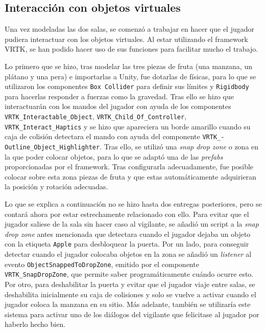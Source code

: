 \subsection{Interacción con objetos virtuales}

Una vez modeladas las dos salas, se comenzó a trabajar en hacer que el jugador pudiera interactuar con los objetos virtuales. Al estar utilizando el framework \acs{VRTK}, se han podido hacer uso de sus funciones para facilitar mucho el trabajo.

Lo primero que se hizo, tras modelar las tres piezas de fruta (una manzana, un plátano y una pera) e importarlas a Unity, fue dotarlas de físicas, para lo que se utilizaron los componentes \texttt{Box Collider} para definir sus límites y \texttt{Rigidbody} para hacerlas responder a fuerzas como la gravedad. Tras ello se hizo que interactuarán con los mandos del jugador con ayuda de los componentes \texttt{VRTK\_Interactable\_Object}, \texttt{VRTK\_Child\_Of\_Controller}, \texttt{VRTK\_Interact\_Haptics} y se hizo que apareciera un borde amarillo cuando su caja de colisión detectara el mando con ayuda del componente \texttt{VRTK\_-} \texttt{Outline\_Object\_Highlighter}. Tras ello, se utilizó una \textit{snap drop zone} o zona en la que poder colocar objetos, para lo que se adaptó una de las \textit{prefabs} proporcionadas por el framework. Tras configurarla adecuadamente, fue posible colocar sobre esta zona piezas de fruta y que estas automáticamente adquirieran la posición y rotación adecuadas.

Lo que se explica a continuación no se hizo hasta dos entregas posteriores, pero se contará ahora por estar estrechamente relacionado con ello. Para evitar que el jugador saliese de la sala sin hacer caso al vigilante, se añadió un script a la \textit{snap drop zone} antes mencionada que detectara cuando el jugador dejaba un objeto con la etiqueta \texttt{Apple} para desbloquear la puerta. Por un lado, para conseguir detectar cuando el jugador colocaba objetos en la zona se añadió un \textit{listener} al evento \texttt{ObjectSnappedToDropZone}, emitido por el componente \texttt{VRTK\_SnapDropZone}, que permite saber programáticamente cuándo ocurre esto. Por otro, para deshabilitar la puerta y evitar que el jugador viaje entre salas, se deshabilita inicialmente su caja de colisiones y solo se vuelve a activar cuando el jugador coloca la manzana en su sitio. Más adelante, también se utilizaría este sistema para activar uno de los diálogos del vigilante que felicitase al jugador por haberlo hecho bien.

